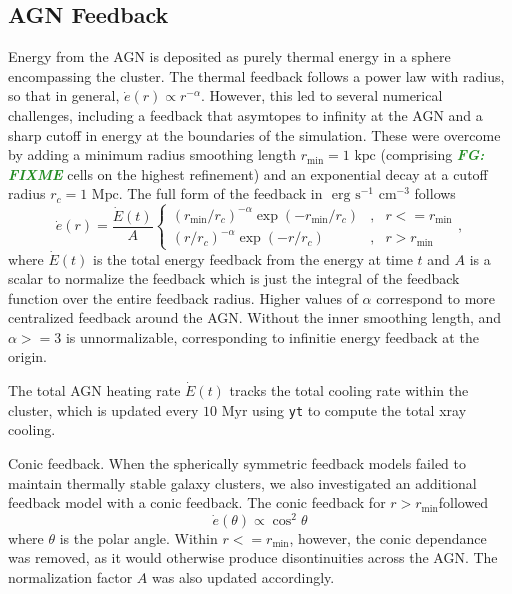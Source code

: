 \documentclass[iop,apjl, twocolappendix]{emulateapj}   %
\def\FG#1{{\textcolor{ForestGreen}{\textbf{\textit{ FG: #1}}}}}
\begin{document}
\subsection{AGN Feedback}
\textbullet Energy from the AGN is deposited as purely thermal energy in a
sphere encompassing the cluster.  The thermal feedback follows a power law with
radius, so that in general, $\dot{e} (r) \propto r^{-\alpha}$. However, this
led to several numerical challenges, including a feedback that asymtopes to
infinity at the AGN and a sharp cutoff in energy at the boundaries of the
simulation. These were overcome by adding a minimum radius smoothing length
$r_{\text{min}} = 1 \text{ kpc}$ (comprising \FG{FIXME} cells on the highest
refinement) and an exponential decay at a cutoff radius $r_c = 1 \text{ Mpc}.$
The full form of the feedback in $\text{ erg} \text{ s}^{-1} \text{ cm}^{-3}$ follows
\begin{equation}
  \dot{e}(r) = \frac{\dot{E}(t)}{A}
  \left\{\begin{matrix}
    \left( r_{\text{min}}/r_c \right )^{-\alpha} \exp {\left ( -r_{\text{min}}/r_c \right )} & , &r <= r_{\text{min}} \\
    \left( r /r_c \right )^{-\alpha} \exp { \left ( -r/r_c \right )}                         & , &r >  r_{\text{min}}
  \end{matrix}\right.,
\end{equation}
where $\dot{E}(t)$ is the total energy feedback from the energy at time $t$ and
$A$ is a scalar to normalize the feedback which is just the integral of the
feedback function over the entire feedback radius. Higher values of $\alpha$
correspond to more centralized feedback around the AGN. Without the inner
smoothing length, and $\alpha >= 3$ is unnormalizable, corresponding to
infinitie energy feedback at the origin.

The total AGN heating rate $\dot E(t)$ tracks the total cooling rate within the
cluster, which is updated every $10 \text{ Myr}$ using \texttt{yt} to compute the total
xray cooling.

\textbullet Conic feedback. When the spherically symmetric feedback models
failed to maintain thermally stable galaxy clusters, we also investigated an
additional feedback model with a conic feedback. The conic feedback for $r >
r_{\text{min}}$followed
\begin{equation}
	\dot{e}(\theta) \propto \cos^2 \theta 
\end{equation}
where $\theta$ is the polar angle. Within $r <= r_{\text{min}}$, however, the
conic dependance was removed, as it would otherwise produce disontinuities
across the AGN. The normalization factor $A$ was also updated accordingly.
\end{document}

